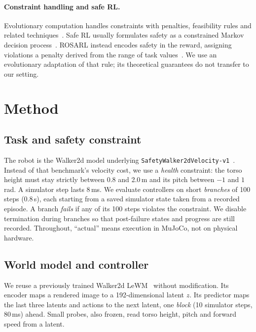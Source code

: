 \documentclass[sigconf,dvipsnames]{acmart}
\newcommand{\rosarl}{ROSARL}
\begin{document}
\paragraph{Constraint handling and safe RL.}
Evolutionary computation handles constraints with penalties, feasibility rules
and related techniques~\cite{coello2002constraint,deb2000constraint}. Safe RL
usually formulates safety as a constrained Markov decision
process~\cite{altman1999cmdp}. \rosarl{} instead encodes safety in the reward,
assigning violations a penalty derived from the range of task
values~\cite{tasse2026simple}. We use an evolutionary adaptation of that rule;
its theoretical guarantees do not transfer to our setting.

\section{Method}
\label{sec:method}

\subsection{Task and safety constraint}

The robot is the Walker2d model underlying
\texttt{SafetyWalker2d\allowbreak Velocity-v1}~\cite{ji2023safetygym}. Instead of that
benchmark's velocity cost, we use a \emph{health} constraint: the torso height
must stay strictly between 0.8 and 2.0\,m and its pitch between $-1$ and
$1$\,rad. A simulator step lasts 8\,ms. We evaluate controllers on short
\emph{branches} of 100 steps (0.8\,s), each starting from a saved simulator
state taken from a recorded episode. A branch \emph{fails} if any of its 100
steps violates the constraint. We disable termination during branches so that
post-failure states and progress are still recorded. Throughout, ``actual''
means execution in MuJoCo, not on physical hardware.

\subsection{World model and controller}

We reuse a previously trained Walker2d LeWM~\cite{maes2026lewm} without
modification. Its encoder maps a rendered image to a 192-dimensional latent
$z$. Its predictor maps the last three latents and actions to the next latent,
one \emph{block} (10 simulator steps, 80\,ms) ahead. Small probes, also
frozen, read torso height, pitch and forward speed from a latent.
\end{document}
